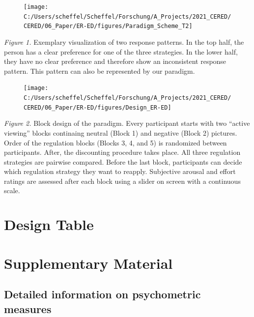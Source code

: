 \documentclass[
  english,
  man,floatsintext]{apa6}
\begin{document}
\newpage
\begin{figure}
\texttt{[image: C:/Users/scheffel/Scheffel/Forschung/A\_Projects/2021\_CERED/CERED/06\_Paper/ER-ED/figures/Paradigm\_Scheme\_T2]} \caption{ }\label{fig:ResponsePatternsAppendix}
\end{figure}

\emph{Figure 1.}
Exemplary visualization of two response patterns.
In the top half, the person has a clear preference for one of the three strategies.
In the lower half, they have no clear preference and therefore show an inconsistent response pattern.
This pattern can also be represented by our paradigm.

\begin{figure}[H]
\texttt{[image: C:/Users/scheffel/Scheffel/Forschung/A\_Projects/2021\_CERED/CERED/06\_Paper/ER-ED/figures/Design\_ER-ED]} \caption{ }\label{fig:DesignEREDappendix}
\end{figure}

\emph{Figure 2.}
Block design of the paradigm.
Every participant starts with two ``active viewing'' blocks continaing neutral (Block 1) and negative (Block 2) pictures.
Order of the regulation blocks (Blocks 3, 4, and 5) is randomized between participants. After, the discounting procedure takes place.
All three regulation strategies are pairwise compared. Before the last block, participants can decide which regulation strategy they want to reapply.
Subjective arousal and effort ratings are assessed after each block using a slider on screen with a continuous scale.

\hypertarget{DesignTable}{%
\section{Design Table}\label{DesignTable}}



\newpage

\hypertarget{SupplementaryMaterial}{%
\section{Supplementary Material}\label{SupplementaryMaterial}}



\newpage

\hypertarget{SupplementQuestionnaires}{%
\subsection{Detailed information on psychometric measures}\label{SupplementQuestionnaires}}
\end{document}
